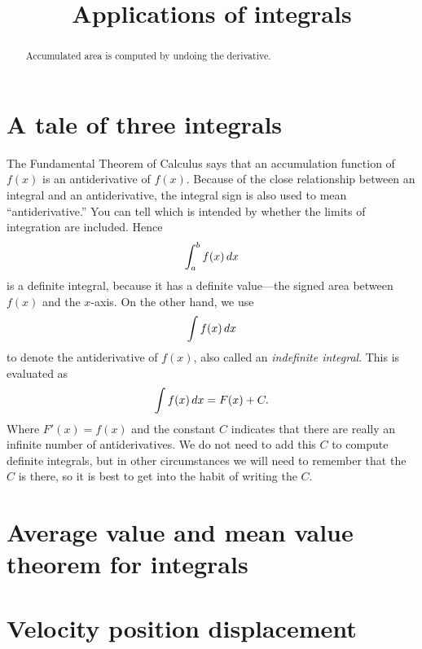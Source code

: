 \documentclass{ximera}
\title[Dig-In:]{Applications of integrals}
\begin{document}
\begin{abstract}
Accumulated area is computed by undoing the derivative. 
\end{abstract}
\maketitle


\section{A tale of three integrals}



The Fundamental Theorem of Calculus says that an accumulation function
of $f(x)$ is an antiderivative of $f(x)$.  Because of the close
relationship between an integral and an antiderivative, the integral
sign is also used to mean ``antiderivative.'' You can tell which is
intended by whether the limits of integration are included. Hence
\[
  \int_a^b f(x)\,d x
\] 
is a definite integral, because it has a definite value---the signed
area between $f(x)$ and the $x$-axis.  On the other hand, we use
\[
  \int f(x)\,d x
\]
to denote the antiderivative of $f(x)$, also called an
\textit{indefinite integral}.
This is evaluated as
\[
  \int f(x)\,d x = F(x)+C.
\]
Where $F'(x) = f(x)$ and the constant $C$ indicates that there are
really an infinite number of antiderivatives. We do not need to add
this $C$ to compute definite integrals, but in other circumstances we
will need to remember that the $C$ is there, so it is best to get into
the habit of writing the $C$.


\section{Average value and mean value theorem for integrals}


\section{Velocity position displacement}
\end{document}

